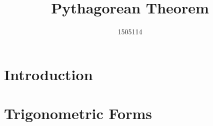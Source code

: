 \documentclass{article}
\title{Pythagorean Theorem}
\author{1505114}
\begin{document}
\maketitle

\section{Introduction}



\section{Trigonometric Forms}

\end{document}
